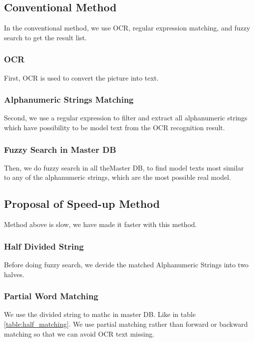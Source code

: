 \documentclass[technicalreport]{ieicej}
\begin{document}
    \subsection{Conventional Method}
        In the conventional method, we use OCR, regular expression matching, and fuzzy search to get the result list.

        \subsubsection{OCR}
        First, OCR is used to convert the picture into text.
        
        \subsubsection{Alphanumeric Strings Matching}
        Second, we use a regular expression to filter and extract all alphanumeric strings which have possibility to be model text from the OCR recognition result.

        \subsubsection{Fuzzy Search in Master DB}
        Then, we do fuzzy search in all theMaster DB, to find model texts most similar to any of the alphanumeric strings, which are the most possible real model. 

    \subsection{Proposal of Speed-up Method}
        Method above is slow, we have made it faster with this method.

        \subsubsection{Half Divided String}
            Before doing fuzzy search, we devide the matched Alphanumeric Strings into two halves.

        \subsubsection{Partial Word Matching}
            We use the divided string to mathc in master DB. Like in table \ref{table:half_matching}. We use partial matching rather than forward or backward matching so that we can avoid OCR text missing.
\end{document}
